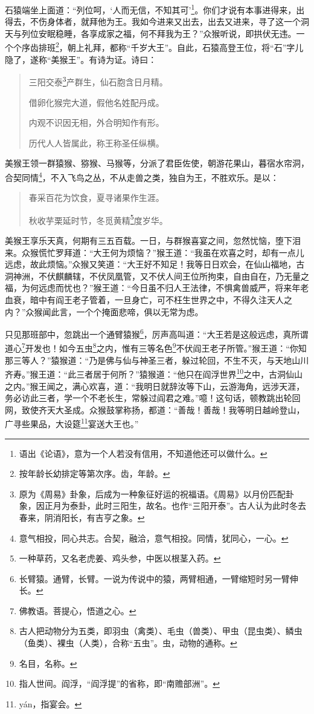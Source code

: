 \documentclass[12pt,UTF8]{ctexbook}
\begin{document}
石猿端坐上面道：“列位呵，‘人而无信，不知其可’\footnote{语出《论语》，意为一个人若没有信用，不知道他还可以做什么。}。你们才说有本事进得来，出得去，不伤身体者，就拜他为王。我如今进来又出去，出去又进来，寻了这一个洞天与列位安眠稳睡，各享成家之福，何不拜我为王？”众猴听说，即拱伏无违。一个个序齿排班\footnote{按年龄长幼排定等第次序。齿，年龄。}，朝上礼拜，都称“千岁大王”。自此，石猿高登王位，将“石”字儿隐了，遂称“美猴王”。有诗为证。诗曰：

\begin{quotation}
三阳交泰\footnote{原为《周易》卦象，后成为一种象征好运的祝福语。《周易》以月份匹配卦象，因正月为泰卦，此时三阳生，故名。也作“三阳开泰”。古人认为此时冬去春来，阴消阳长，有吉亨之象。}产群生，仙石胞含日月精。

借卵化猴完大道，假他名姓配丹成。

内观不识因无相，外合明知作有形。

历代人人皆属此，称王称圣任纵横。
\end{quotation}

美猴王领一群猿猴、猕猴、马猴等，分派了君臣佐使，朝游花果山，暮宿水帘洞，合契同情\footnote{意气相投，同心共志。合契，融洽，意气相投。同情，犹同心，一心。}，不入飞鸟之丛，不从走兽之类，独自为王，不胜欢乐。是以：

\begin{quotation}
春采百花为饮食，夏寻诸果作生涯。

秋收芋栗延时节，冬觅黄精\footnote{一种草药，又名老虎姜、鸡头参，中医以根茎入药。}度岁华。
\end{quotation}

美猴王享乐天真，何期有三五百载。一日，与群猴喜宴之间，忽然忧恼，堕下泪来。众猴慌忙罗拜道：“大王何为烦恼？”猴王道：“我虽在欢喜之时，却有一点儿远虑，故此烦恼。”众猴又笑道：“大王好不知足！我等日日欢会，在仙山福地，古洞神洲，不伏麒麟辖，不伏凤凰管，又不伏人间王位所拘束，自由自在，乃无量之福，为何远虑而忧也？”猴王道：“今日虽不归人王法律，不惧禽兽威严，将来年老血衰，暗中有阎王老子管着，一旦身亡，可不枉生世界之中，不得久注天人之内？”众猴闻此言，一个个掩面悲啼，俱以无常为虑。

只见那班部中，忽跳出一个通臂猿猴\footnote{长臂猿。通臂，长臂。一说为传说中的猿，两臂相通，一臂缩短时另一臂伸长。}，厉声高叫道：“大王若是这般远虑，真所谓道心\footnote{佛教语。菩提心，悟道之心。}开发也！如今五虫\footnote{古人把动物分为五类，即羽虫（禽类）、毛虫（兽类）、甲虫（昆虫类）、鳞虫（鱼类）、裸虫（人类），合称“五虫”。虫，动物的通称。}之内，惟有三等名色\footnote{名目，名称。}不伏阎王老子所管。”猴王道：“你知那三等人？”猿猴道：“乃是佛与仙与神圣三者，躲过轮回，不生不灭，与天地山川齐寿。”猴王道：“此三者居于何所？”猿猴道：“他只在阎浮世界\footnote{指人世间。阎浮，“阎浮提”的省称，即“南赡部洲”。}之中，古洞仙山之内。”猴王闻之，满心欢喜，道：“我明日就辞汝等下山，云游海角，远涉天涯，务必访此三者，学一个不老长生，常躲过阎君之难。”噫！这句话，顿教跳出轮回网，致使齐天大圣成。众猴鼓掌称扬，都道：“善哉！善哉！我等明日越岭登山，广寻些果品，大设筵\footnote{y\'an，指宴会。}宴送大王也。”
\end{document}
